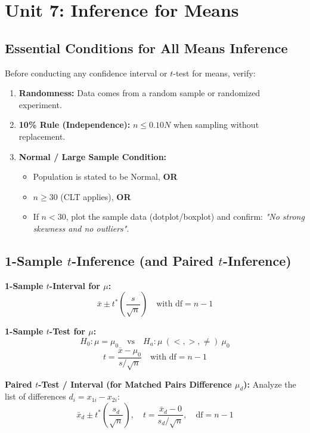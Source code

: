 \chapter{Unit 7: Inference for Means}

\section{Essential Conditions for All Means Inference}

Before conducting any confidence interval or $t$-test for means, verify:
\begin{enumerate}
    \item \textbf{Randomness:} Data comes from a random sample or randomized experiment.
    \item \textbf{10\% Rule (Independence):} $n \le 0.10N$ when sampling without replacement.
    \item \textbf{Normal / Large Sample Condition:}
    \begin{itemize}
        \item Population is stated to be Normal, \textbf{OR}
        \item $n \ge 30$ (CLT applies), \textbf{OR}
        \item If $n < 30$, plot the sample data (dotplot/boxplot) and confirm: \emph{"No strong skewness and no outliers"}.
    \end{itemize}
\end{enumerate}

\section{1-Sample $t$-Inference (and Paired $t$-Inference)}

\begin{formulabox}
\textbf{1-Sample $t$-Interval for $\mu$:}
\[
\bar{x} \pm t^* \left(\frac{s}{\sqrt{n}}\right) \quad \text{with } \text{df} = n - 1
\]

\textbf{1-Sample $t$-Test for $\mu$:}
\[
H_0: \mu = \mu_0 \quad \text{vs} \quad H_a: \mu \ (<, >, \ne) \ \mu_0
\]
\[
t = \frac{\bar{x} - \mu_0}{s / \sqrt{n}} \quad \text{with } \text{df} = n - 1
\]

\textbf{Paired $t$-Test / Interval (for Matched Pairs Difference $\mu_d$):}
Analyze the list of differences $d_i = x_{1i} - x_{2i}$:
\[
\bar{x}_d \pm t^* \left(\frac{s_d}{\sqrt{n}}\right), \quad t = \frac{\bar{x}_d - 0}{s_d / \sqrt{n}}, \quad \text{df} = n - 1
\]
\end{formulabox}

